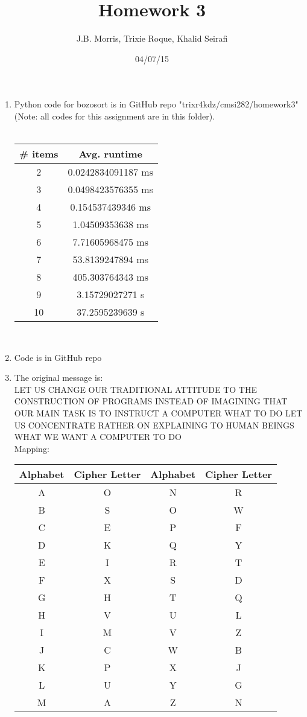 \documentclass{article}
\author{J.B. Morris, Trixie Roque, Khalid Seirafi}
\title{Homework 3}
\date{04/07/15}
\begin{document}
\maketitle

	\begin{enumerate}
		\item
			Python code for bozosort is in GitHub repo "trixr4kdz/cmsi282/homework3" (Note: all codes for this assignment are in this folder). \\
			\\
			\begin{tabular} {| c | c |}
				\hline
				\# items & Avg. runtime \\ \hline
				2 & 0.0242834091187 ms \\ \hline
				3 &  0.0498423576355 ms \\ \hline
				4 &  0.154537439346 ms \\ \hline
				5 & 1.04509353638 ms \\ \hline
				6 & 7.71605968475 ms \\ \hline
				7 & 53.8139247894 ms \\ \hline
				8 & 405.303764343 ms \\ \hline
				9 & 3.15729027271 s \\ \hline
				10 & 37.2595239639 s\\ \hline
			\end{tabular}
			\\
			
		\item
			Code is in GitHub repo
			\\
			
		\item
			The original message is: \\
			LET US CHANGE OUR TRADITIONAL ATTITUDE TO THE CONSTRUCTION OF PROGRAMS INSTEAD OF IMAGINING THAT OUR MAIN TASK IS TO INSTRUCT A COMPUTER WHAT TO DO LET US CONCENTRATE RATHER ON EXPLAINING TO HUMAN BEINGS WHAT WE WANT A COMPUTER TO DO
			\\
			
			Mapping:
			\begin{tabular} {| c  c | c  c |}
				\hline
				Alphabet & Cipher Letter  & Alphabet & Cipher Letter \\ \hline
				A & O & N & R \\ \hline
				B & S & O & W \\ \hline
				C & E & P & F \\ \hline
				D & K & Q & Y \\ \hline
				E & I & R & T \\ \hline
				F & X & S & D \\ \hline
				G & H & T & Q \\ \hline
				H & V & U & L \\ \hline
				I & M & V & Z \\ \hline
				J & C & W & B \\ \hline
				K & P & X & J \\ \hline
				L & U & Y & G \\ \hline
				M & A & Z & N \\ \hline				
				\end{tabular}
				\\
		

\end{enumerate}
\end{document}
